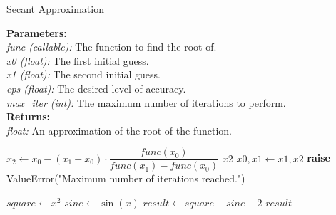\documentclass{report}
\begin{document}
      \begin{algorithm}
      \caption{Secant Approximation}\label{Root Approximation}
        \begin{tabbing}
          \textbf{Parameters:}\\
            \hspace{1em}\textit{func (callable):} The function to find the root of.\\
            \hspace{1em}\textit{x0 (float):} The first initial guess.\\
            \hspace{1em}\textit{x1 (float):} The second initial guess.\\
            \hspace{1em}\textit{eps (float):} The desired level of accuracy.\\
            \hspace{1em}\textit{max\_iter (int):} The maximum number of iterations to perform.\\
            
          \textbf{Returns:}\\
            \hspace{1em}\textit{float:} An approximation of the root of the function.
        \end{tabbing}
        \vspace{1 em}
      \begin{algorithmic}[1]
            \State $x_2 \gets x_0 - (x_1 - x_0) \cdot \dfrac{func(x_0)}{func(x_1) - func(x_0)}$ 
              \State \Return $x2$
            \Else
              \State $x0, x1 \gets x1, x2$ 
            \EndIf
          \EndFor
          \State \textbf{raise} ValueError("Maximum number of iterations reached.")
        \EndFunction
        \end{algorithmic}
        \vspace{1 em}
        
        \begin{algorithmic}[1]
            \State $square \gets x^2$
            \State $sine \gets \sin(x)$
            \State $result \gets square + sine - 2$
            \State \Return $result$
          \EndFunction
        \end{algorithmic}      
      \end{algorithm}
\end{document}
